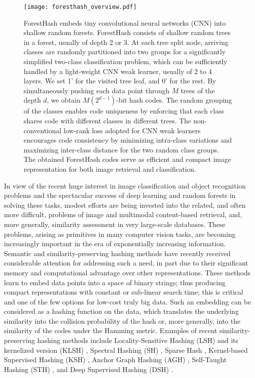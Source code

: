\documentclass[runningheads]{llncs}
\begin{document}
\begin{figure*}[t]
\centering
 \texttt{[image: foresthash\_overview.pdf]}
\caption{ForestHash embeds tiny convolutional neural networks (CNN) into shallow
  random forests. ForestHash consists of shallow random trees in a forest,
  usually of depth 2 or 3. At each tree split node, arriving classes are
  randomly partitioned into two groups for a significantly simplified two-class
  classification problem, which can be sufficiently handled by a light-weight
  CNN weak learner, usually of 2 to 4 layers.  We set 1’ for the visited tree
  leaf, and 0’ for the rest. By simultaneously pushing each data point through
  $M$ trees of the depth $d$, we obtain $M (2^{d-1})$-bit hash codes.  The
  random grouping of the classes enables code uniqueness by enforcing that each
  class shares code with different classes in different trees. The
  non-conventional low-rank loss adopted for CNN weak learners encourages code
  consistency by minimizing intra-class variations and maximizing inter-class
  distance for the two random class groups.  The obtained ForestHash codes serve
  as efficient and compact image representation for both image retrieval and
  classification.  }
\label{fig:overview}
\end{figure*}




In view of the recent huge interest in image classification and object
recognition problems and the spectacular success of deep learning and random
forests in solving these tasks,  modest
efforts are being invested into the related, and often more difficult, problems
of image and multimodal content-based retrieval, and, more generally, similarity
assessment in very large-scale databases. These problems, arising as primitives
in many computer vision tasks, are becoming increasingly important in the era of
exponentially increasing information.  Semantic and similarity-preserving
hashing methods have recently received considerable attention for addressing
such a need, in part due to their significant memory and computational advantage
over other representations.  These methods learn to embed data points into a
space of binary strings; thus producing compact representations with constant or
sub-linear search time; this is critical and one of the few options for low-cost
truly big data.  Such an embedding can be considered as a hashing function on
the data, which translates the underlying similarity into the collision
probability of the hash or, more generally, into the similarity of the codes
under the Hamming metric.  Examples of recent similarity-preserving hashing
methods include Locality-Sensitive Hashing (LSH) \cite{LSH} and its kernelized
version (KLSH) \cite{KLSH}, Spectral Hashing (SH) \cite{SH}, Sparse Hash
\cite{sparsehash}, Kernel-based Supervised Hashing (KSH) \cite{KSH}, Anchor
Graph Hashing (AGH) \cite{AGH}, Self-Taught Hashing (STH) \cite{STH}, and Deep
Supervised Hashing (DSH) \cite{DSH}.
\end{document}
